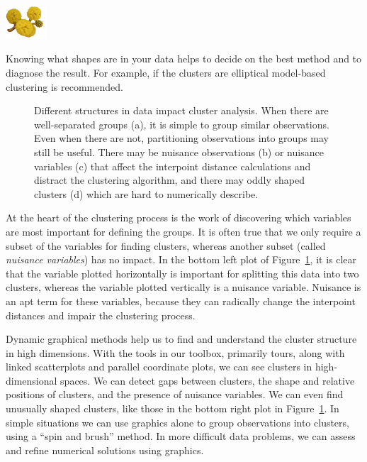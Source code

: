 \documentclass[
  letterpaper,
]{krantz}
\newcommand{\infobox}[1]{%
\noindent\colorbox{info!30}{%
\begin{minipage}{0.98\linewidth}%
    \centering%
    \begin{minipage}[c]{0.15\linewidth} %
      \includegraphics[width=1.5cm]{images/mulga-flowers2.png} %
    \end{minipage}%
    \hfill %
    \begin{minipage}[c]{0.8\linewidth} %
      \bigskip%
      \textsf{#1}%
      \bigskip%
    \end{minipage}%
    \hspace*{3mm}%
  \end{minipage}%
}%
}
\begin{document}
\infobox{Knowing what shapes are in your data helps to decide on the best method and to diagnose the result. For example, if the clusters are elliptical model-based clustering is recommended.}

\begin{figure}


\caption{\label{fig-ideal-clusters}Different structures in data impact
cluster analysis. When there are well-separated groups (a), it is simple
to group similar observations. Even when there are not, partitioning
observations into groups may still be useful. There may be nuisance
observations (b) or nuisance variables (c) that affect the interpoint
distance calculations and distract the clustering algorithm, and there
may oddly shaped clusters (d) which are hard to numerically describe.}

\end{figure}%

At the heart of the clustering process is the work of discovering which
variables are most important for defining the groups. It is often true
that we only require a subset of the variables for finding clusters,
whereas another subset (called \emph{nuisance variables}) has no impact.
In the bottom left plot of Figure~\ref{fig-ideal-clusters}, it is clear
that the variable plotted horizontally is important for splitting this
data into two clusters, whereas the variable plotted vertically is a
nuisance variable. Nuisance is an apt term for these variables, because
they can radically change the interpoint distances and impair the
clustering process. 

Dynamic graphical methods help us to find and understand the cluster
structure in high dimensions. With the tools in our toolbox, primarily
tours, along with linked scatterplots and parallel coordinate plots, we
can see clusters in high-dimensional spaces. We can detect gaps between
clusters, the shape and relative positions of clusters, and the presence
of nuisance variables. We can even find unusually shaped clusters, like
those in the bottom right plot in Figure~\ref{fig-ideal-clusters}. In
simple situations we can use graphics alone to group observations into
clusters, using a ``spin and brush'' method. In more difficult data
problems, we can assess and refine numerical solutions using
graphics.
\end{document}
